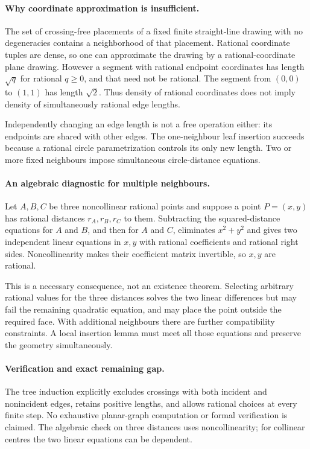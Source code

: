 \documentclass[11pt,a4paper]{article}
\begin{document}
\paragraph{Why coordinate approximation is insufficient.}
The set of crossing-free placements of a fixed finite straight-line drawing with no degeneracies contains a neighborhood of that placement. Rational coordinate tuples are dense, so one can approximate the drawing by a rational-coordinate plane drawing. However a segment with rational endpoint coordinates has length $\sqrt q$ for rational $q\ge0$, and that need not be rational. The segment from $(0,0)$ to $(1,1)$ has length $\sqrt2$. Thus density of rational coordinates does not imply density of simultaneously rational edge lengths.

Independently changing an edge length is not a free operation either: its endpoints are shared with other edges. The one-neighbour leaf insertion succeeds because a rational circle parametrization controls its only new length. Two or more fixed neighbours impose simultaneous circle-distance equations.

\paragraph{An algebraic diagnostic for multiple neighbours.}
Let $A,B,C$ be three noncollinear rational points and suppose a point $P=(x,y)$ has rational distances $r_A,r_B,r_C$ to them. Subtracting the squared-distance equations for $A$ and $B$, and then for $A$ and $C$, eliminates $x^2+y^2$ and gives two independent linear equations in $x,y$ with rational coefficients and rational right sides. Noncollinearity makes their coefficient matrix invertible, so $x,y$ are rational.

This is a necessary consequence, not an existence theorem. Selecting arbitrary rational values for the three distances solves the two linear differences but may fail the remaining quadratic equation, and may place the point outside the required face. With additional neighbours there are further compatibility constraints. A local insertion lemma must meet all those equations and preserve the geometry simultaneously.

\paragraph{Verification and exact remaining gap.}
The tree induction explicitly excludes crossings with both incident and nonincident edges, retains positive lengths, and allows rational choices at every finite step. No exhaustive planar-graph computation or formal verification is claimed. The algebraic check on three distances uses noncollinearity; for collinear centres the two linear equations can be dependent.
\end{document}
